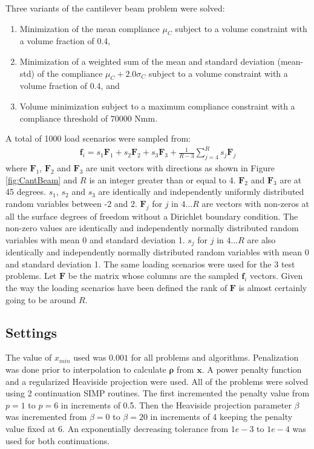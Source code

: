     Three variants of the cantilever beam problem were solved:
    \begin{enumerate}
      \item Minimization of the mean compliance $\mu_C$ subject to a volume constraint with a volume fraction of 0.4,
      \item Minimization of a weighted sum of the mean and standard deviation (mean-std) of the compliance $\mu_C + 2.0 \sigma_C$ subject to a volume constraint with a volume fraction of 0.4, and
      \item Volume minimization subject to a maximum compliance constraint with a compliance threshold of $70000 \text{ Nmm}$.
    \end{enumerate}
    A total of 1000 load scenarios were sampled from:
    \begin{align}
      \bm{f}_i = s_1 \bm{F}_1 + s_2 \bm{F}_2 + s_3 \bm{F}_3 + \frac{1}{R - 3} \sum_{j=4}^{R} s_j \bm{F}_j
    \end{align}
    where $\bm{F}_1$, $\bm{F}_2$ and $\bm{F}_3$ are unit vectors with directions as shown in Figure \ref{fig:CantBeam} and $R$ is an integer greater than or equal to 4. $\bm{F}_2$ and $\bm{F}_3$ are at 45 degrees. $s_1$, $s_2$ and $s_3$ are identically and independently uniformly distributed random variables between -2 and 2. $\bm{F}_j$ for $j$ in $4 \dots R$ are vectors with non-zeros at all the surface degrees of freedom without a Dirichlet boundary condition. The non-zero values are identically and independently normally distributed random variables with mean 0 and standard deviation 1. $s_j$ for $j$ in $4 \dots R$ are also identically and independently normally distributed random variables with mean 0 and standard deviation 1. The same loading scenarios were used for the 3 test problems. Let $\bm{F}$ be the matrix whose columns are the sampled $\bm{f}_i$ vectors. Given the way the loading scenarios have been defined the rank of $\bm{F}$ is almost certainly going to be around $R$.

  \subsection{Settings}

    The value of $x_{min}$ used was $0.001$ for all problems and algorithms. Penalization was done prior to interpolation to calculate $\bm{\rho}$ from $\bm{x}$. A power penalty function and a regularized Heaviside projection were used. All of the problems were solved using 2 continuation SIMP routines. The first incremented the penalty value from $p = 1$ to $p = 6$ in increments of 0.5. Then the Heaviside projection parameter $\beta$ was incremented from $\beta = 0$ to $\beta = 20$ in increments of 4 keeping the penalty value fixed at 6. An exponentially decreasing tolerance from $1e-3$ to $1e-4$ was used for both continuations. 

